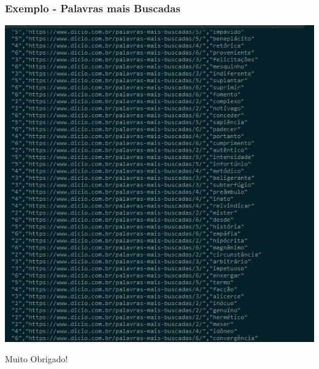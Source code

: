 \documentclass{beamer}
\begin{document}
\begin{frame}
\frametitle{Exemplo - Palavras mais Buscadas}
\includegraphics[width=\textwidth]{palavras_freq6.png}
\end{frame}

\begin{frame}
\end{frame}
\begin{frame}
\Huge{\centerline{Muito Obrigado!}}
\end{frame}


\end{document}
